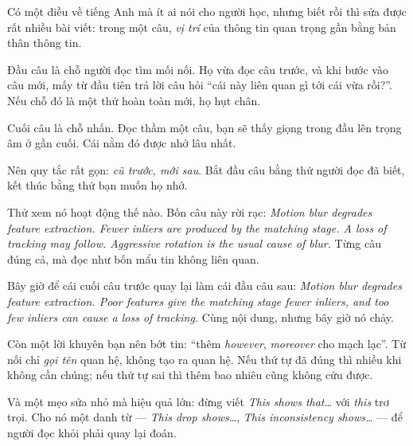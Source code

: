 \documentclass[../../english.tex]{subfiles}
\begin{document}
\begin{dongian}
Có một điều về tiếng Anh mà ít ai nói cho người học, nhưng biết rồi thì sửa được rất nhiều bài viết: trong một câu, \emph{vị trí} của thông tin quan trọng gần bằng bản thân thông tin.

Đầu câu là chỗ người đọc tìm mối nối. Họ vừa đọc câu trước, và khi bước vào câu mới, mấy từ đầu tiên trả lời câu hỏi ``cái này liên quan gì tới cái vừa rồi?''. Nếu chỗ đó là một thứ hoàn toàn mới, họ hụt chân.

Cuối câu là chỗ nhấn. Đọc thầm một câu, bạn sẽ thấy giọng trong đầu lên trọng âm ở gần cuối. Cái nằm đó được nhớ lâu nhất.

Nên quy tắc rất gọn: \emph{cũ trước, mới sau}. Bắt đầu câu bằng thứ người đọc đã biết, kết thúc bằng thứ bạn muốn họ nhớ.

Thử xem nó hoạt động thế nào. Bốn câu này rời rạc: \emph{Motion blur degrades feature extraction. Fewer inliers are produced by the matching stage. A loss of tracking may follow. Aggressive rotation is the usual cause of blur.} Từng câu đúng cả, mà đọc như bốn mẩu tin không liên quan.

Bây giờ để cái cuối câu trước quay lại làm cái đầu câu sau: \emph{Motion blur degrades feature extraction. Poor features give the matching stage fewer inliers, and too few inliers can cause a loss of tracking.} Cùng nội dung, nhưng bây giờ nó chảy.

Còn một lời khuyên bạn nên bớt tin: ``thêm \emph{however}, \emph{moreover} cho mạch lạc''. Từ nối chỉ \emph{gọi tên} quan hệ, không tạo ra quan hệ. Nếu thứ tự đã đúng thì nhiều khi không cần chúng; nếu thứ tự sai thì thêm bao nhiêu cũng không cứu được.

Và một mẹo sửa nhỏ mà hiệu quả lớn: đừng viết \emph{This shows that\ldots} với \emph{this} trơ trọi. Cho nó một danh từ --- \emph{This drop shows\ldots}, \emph{This inconsistency shows\ldots} --- để người đọc khỏi phải quay lại đoán.
\end{dongian}
\end{document}
